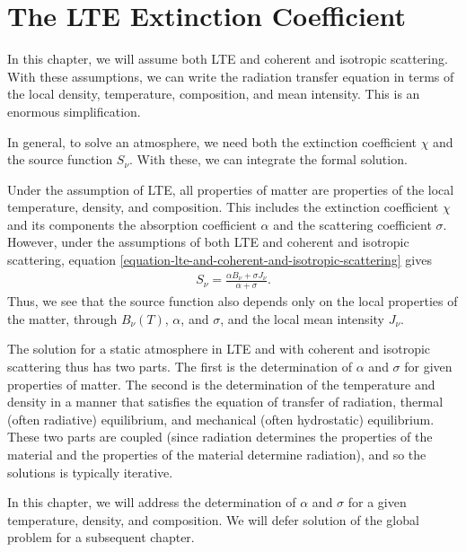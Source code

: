 
\newcommand{\crosssection}{a}

\chapter{The LTE Extinction Coefficient}
\label{chapter-lte-opacity-and-emissivity}

 In this chapter, we will assume both LTE and coherent and isotropic scattering. With these assumptions, we can write the radiation transfer equation in terms of the local density, temperature, composition, and mean intensity. This is an enormous simplification. 

\newslide

In general, to solve an atmosphere, we need both the extinction coefficient $\chi$ and the source function $S_\nu$. With these, we can integrate the formal solution. 

Under the assumption of LTE, all properties of matter are properties of the local temperature, density, and composition. This includes the extinction coefficient $\chi$ and its components the absorption coefficient $\alpha$ and the scattering coefficient $\sigma$.
However, under the assumptions of both LTE and coherent and isotropic scattering, equation \ref{equation-lte-and-coherent-and-isotropic-scattering} gives
\begin{align}
S_\nu = \frac{\alpha B_\nu + \sigma J_\nu}{\alpha + \sigma}.
\end{align}
Thus, we see that the source function also depends only on the local properties of the matter, through $B_\nu(T)$, $\alpha$, and $\sigma$, and the local mean intensity $J_\nu$.

The solution for a static atmosphere in LTE and with coherent and isotropic scattering thus has two parts. The first is the determination of $\alpha$ and $\sigma$ for given properties of matter. The second is the determination of the temperature and density in a manner that satisfies the equation of transfer of radiation, thermal (often radiative) equilibrium, and mechanical (often hydrostatic) equilibrium. These two parts are coupled (since radiation determines the properties of the material and the properties of the material determine radiation), and so the solutions is typically iterative.

In this chapter, we will address the determination of $\alpha$ and $\sigma$ for a given temperature, density, and composition. We will defer solution of the global problem for a subsequent chapter.

